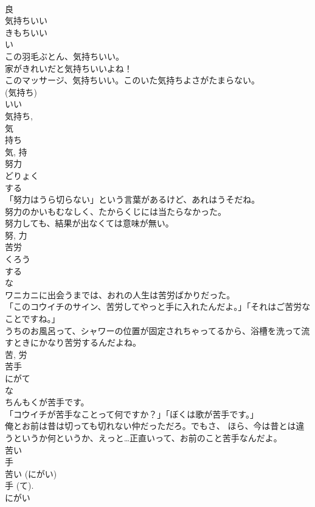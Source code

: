 \documentclass[8pt]{extreport}
\begin{document}
\begin{CJK}{UTF8}{min}
\\	良	
\\	気持ちいい	
\\	きもちいい	
\\	い 
\\	この羽毛ぶとん、気持ちいい。	
\\	家がきれいだと気持ちいいよね！	
\\	このマッサージ、気持ちいい。このいた気持ちよさがたまらない。	
\\	(気持ち) 
\\	いい 
\\	気持ち, 
\\	気 
\\	持ち 
\\	気, 持	
\\	努力	
\\	どりょく	
\\	する 
\\	「努力はうら切らない」という言葉があるけど、あれはうそだね。	
\\	努力のかいもむなしく、たからくじには当たらなかった。	
\\	努力しても、結果が出なくては意味が無い。	
\\	努, 力	
\\	苦労	
\\	くろう	
\\	する 
\\	な 
\\	ワニカニに出会うまでは、おれの人生は苦労ばかりだった。	
\\	「このコウイチのサイン、苦労してやっと手に入れたんだよ。」「それはご苦労なことですね。」	
\\	うちのお風呂って、シャワーの位置が固定されちゃってるから、浴槽を洗って流すときにかなり苦労するんだよね。	
\\	苦, 労	
\\	苦手	
\\	にがて	
\\	な 
\\	ちんもくが苦手です。	
\\	「コウイチが苦手なことって何ですか？」「ぼくは歌が苦手です。」	
\\	俺とお前は昔は切っても切れない仲だっただろ。でもさ、 ほら、今は昔とは違うというか何というか、えっと…正直いって、お前のこと苦手なんだよ。	
\\	苦い 
\\	手 
\\	苦い (にがい) 
\\	手 (て). 
\\	にがい 

\end{CJK}
\end{document}
